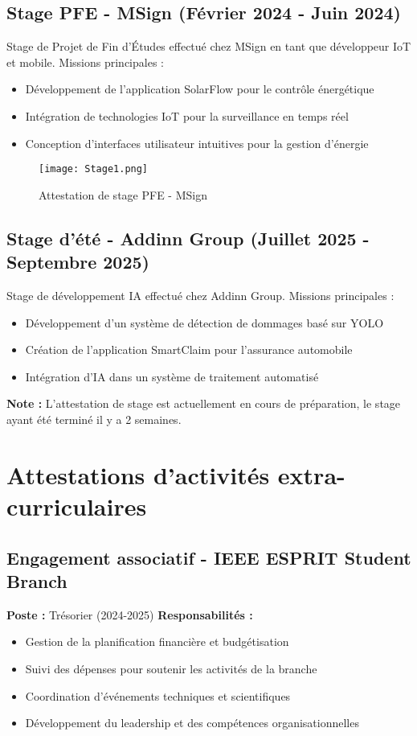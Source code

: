 \documentclass[12pt,a4paper]{report}
\begin{document}
\subsection{Stage PFE - MSign (Février 2024 - Juin 2024)}
Stage de Projet de Fin d'Études effectué chez MSign en tant que développeur IoT et mobile.
Missions principales : 
\begin{itemize}
    \item Développement de l'application SolarFlow pour le contrôle énergétique
    \item Intégration de technologies IoT pour la surveillance en temps réel
    \item Conception d'interfaces utilisateur intuitives pour la gestion d'énergie
\end{itemize}

\begin{figure}[H]
    \centering
    \texttt{[image: Stage1.png]}
    \caption{Attestation de stage PFE - MSign}
    \label{fig:stage_msign}
\end{figure}

\subsection{Stage d'été - Addinn Group (Juillet 2025 - Septembre 2025)}
Stage de développement IA effectué chez Addinn Group.
Missions principales :
\begin{itemize}
    \item Développement d'un système de détection de dommages basé sur YOLO
    \item Création de l'application SmartClaim pour l'assurance automobile
    \item Intégration d'IA dans un système de traitement automatisé
\end{itemize}

\textbf{Note :} L'attestation de stage est actuellement en cours de préparation, le stage ayant été terminé il y a 2 semaines.

\section{Attestations d'activités extra-curriculaires}

\subsection{Engagement associatif - IEEE ESPRIT Student Branch}
\textbf{Poste :} Trésorier (2024-2025)
\textbf{Responsabilités :}
\begin{itemize}
    \item Gestion de la planification financière et budgétisation
    \item Suivi des dépenses pour soutenir les activités de la branche
    \item Coordination d'événements techniques et scientifiques
    \item Développement du leadership et des compétences organisationnelles
\end{itemize}
\end{document}
